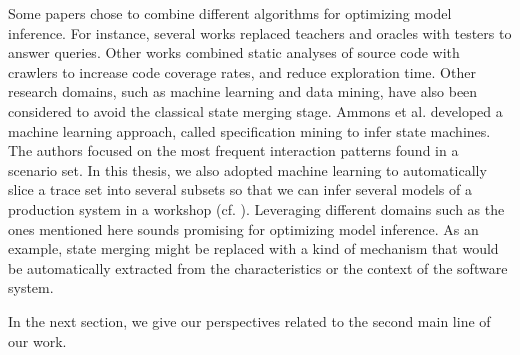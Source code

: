 Some papers chose to combine different algorithms for optimizing
model inference. For instance, several works
\cite{Alur:2005:SIS:1047659.1040314,Raffelt:2005:LLA:1081180.1081189,ngll11}
replaced teachers and oracles with testers to answer queries.
Other works \cite{Azim13,WPX13} combined static analyses of
source code with crawlers to increase code coverage rates, and
reduce exploration time. Other  research domains, such as machine
learning and data mining, have also been considered to avoid the
classical state merging stage. Ammons et al.
\cite{Ammons:2002:MS:565816.503275} developed a machine learning
approach, called specification mining to infer state machines.
The authors focused on the most frequent interaction patterns
found in a scenario set. In this thesis, we also adopted machine
learning to automatically slice a trace set into several subsets
so that we can infer several models of a production system in a
workshop (cf.
).
Leveraging different domains such as the ones mentioned here
sounds promising for optimizing model inference. As an example,
state merging might be replaced with a kind of mechanism that
would be automatically extracted from the characteristics or the
context of the software system.

In the next section, we give our perspectives related to the
second main line of our work.
